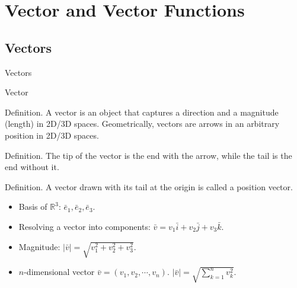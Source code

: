 \documentclass{beamer}
\begin{document}
\section{Vector and Vector Functions}

    \subsection{Vectors} 

    \begin{frame}[t]{Vectors}
        \begin{block}{Vector}
            \par \textcolor{yy}{Definition.} A \textcolor{yy}{vector} is an object that captures a direction and a magnitude (length) in 2D/3D spaces. Geometrically, vectors are arrows in an arbitrary position in 2D/3D spaces.

            \par \textcolor{yy}{Definition.} The \textcolor{yy}{tip} of the vector is the end with the arrow, while the \textcolor{yy}{tail} is the end without it.

            \par \textcolor{yy}{Definition.} A vector drawn with its tail at the origin is called a \textcolor{yy}{position vector}.
        \end{block}

        \begin{itemize}
            \item Basis of $\mathbb{R}^3$: $\bar{e}_1,\bar{e}_2,\bar{e}_3$.
            \item Resolving a vector into components: $\bar{v} = v_1 \bar{i} + v_2 \bar{j} + v_3 \bar{k}$.
            \item Magnitude: $\left| \bar{v} \right| = \sqrt{v_1^2 + v_2^2 + v_3^2}$.
            \item $n$-dimensional vector $\bar{v} = (v_1,v_2,\cdots,v_n)$. $\left| \bar{v} \right| = \sqrt{\sum\limits_{k=1}^{n}v_k^2}$.
        \end{itemize}
    \end{frame}
\end{document}
